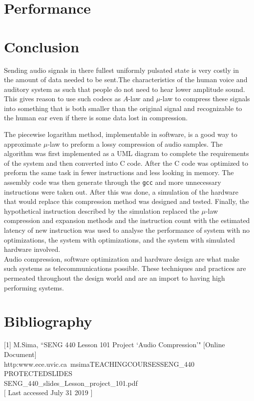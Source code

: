 \documentclass[12pt]{article}
\begin{document}
\section{Performance}



\section{Conclusion}

Sending audio signals in there fullest uniformly pulsated state is very costly in the amount of data needed to be sent.The characteristics of the human voice and auditory system as such that people do not need to hear lower amplitude sound. This gives reason to use such codecs as $A$-law and $\mu$-law to compress these signals into something that is both smaller than the original signal and recognizable to the human ear even if there is some data lost in compression. 

The piecewise logarithm method, implementable in software, is a good way to approximate $\mu$-law to preform a lossy compression of audio samples. The algorithm was first implemented as a UML diagram to complete the requirements of the system and then converted into C code. After the C code was optimized to preform the same task in fewer instructions and less looking in memory. The assembly code was then generate through the \texttt{gcc} and more unnecessary instructions were taken out. After this was done, a simulation of the hardware that would replace this compression method was designed and tested. Finally, the hypothetical instruction described by the simulation replaced the $\mu$-law compression and expansion methods and the instruction count with the estimated latency of new instruction was used to analyse the performance of system with no optimizations, the system with optimizations, and the system with simulated hardware involved.\\

Audio compression, software optimization and hardware design are what make such systems as telecommunications possible. These techniques and practices are permeated throughout the design world and are an import to having high performing systems.\\
   

\newpage
\section{Bibliography}
[1] M.Sima, ``SENG 440 Lesson 101 Project ‘Audio Compression’" $[$Online Document$]$\\
http:\/\/www.ece.uvic.ca\/~msima\/TEACHING\/COURSES\/SENG\_440\/
PROTECTED\/SLIDES\\\/SENG\_440\_slides\_Lesson\_project\_101.pdf\\
$[$ Last accessed July 31 2019 $]$
\end{document}
